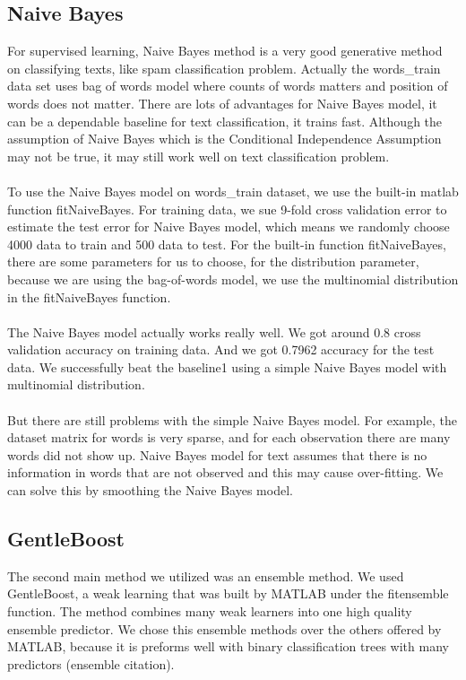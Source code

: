 \documentclass[]{article}
\begin{document}
\subsection{Naive Bayes}

For supervised learning, Naive Bayes method is a very good generative method on classifying texts, like spam classification problem. Actually the words\_train data set uses bag of words model where counts of words matters and position of words does not matter. There are lots of advantages for Naive Bayes model, it can be a dependable baseline for text classification, it trains fast. Although the assumption of Naive Bayes which is the Conditional Independence Assumption may not be true, it may still work well on text classification problem.\\\\

To use the Naive Bayes model on words\_train dataset, we use the built-in matlab function fitNaiveBayes. For training data, we sue 9-fold cross validation error to estimate the test error for Naive Bayes model, which means we randomly choose 4000 data to train and 500 data to test. For the built-in function fitNaiveBayes, there are some parameters for us to choose, for the distribution parameter, because we are using the bag-of-words model, we use the multinomial distribution in the fitNaiveBayes function. \\\\

The Naive Bayes model actually works really well. We got around 0.8 cross validation accuracy on training data. And we got 0.7962 accuracy for the test data. We successfully beat the baseline1 using a simple Naive Bayes model with multinomial distribution. \\\\

But there are still problems with the simple Naive Bayes model. For example, the dataset matrix for words is very sparse, and for each observation there are many  words did not show up. Naive Bayes model for text assumes that there is no information in words that are not observed and this may cause over-fitting. We can solve this by smoothing the Naive Bayes model.

\subsection{GentleBoost}

The second main method we utilized was an ensemble method. We used GentleBoost, a weak learning that was built by MATLAB under the fitensemble function. The method combines many weak learners into one high quality ensemble predictor. We chose this ensemble methods over the others offered by MATLAB, because it is preforms well with binary classification trees with many predictors (ensemble citation). \\
\end{document}
